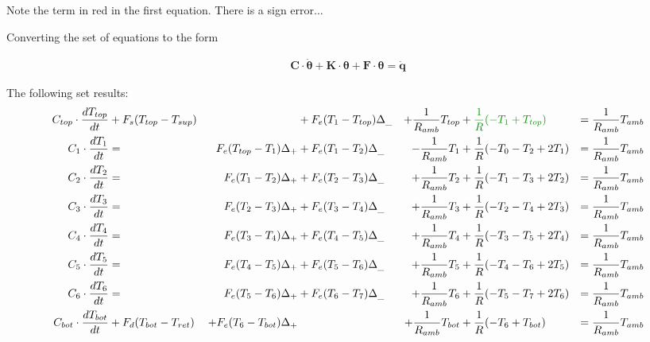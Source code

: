 \begin{scriptsize}
	Note the term in red in the first equation. There is a sign error...
	
	Converting the set of equations to the form
	
	\begin{subequations}
		\label{eq:matnot}
		\begin{align}
			\mathbf{C} \cdot \boldsymbol{\dot{\theta}} + \mathbf{K} \cdot \boldsymbol{\theta} + \mathbf{F} \cdot \boldsymbol{\theta}= \mathbf{\dot{q}}
		\end{align}
	\end{subequations}
	
	The following set results:
	\begin{equation}
		\begin{aligned}
			C_{top} \cdot \frac{dT_{top}}{dt} &+F_s (T_{top} - T_{sup}) &&+ F_e (T_1 - T_{top}) \Delta_{\_} &+ \frac{1}{R_{amb}} T_{top} &+ {\color{darkgreen}\frac{1}{R} (-T_1 + T_{top})}  &= \frac{1}{R_{amb}} T_{amb} \\
			C_1 \cdot \frac{dT_1}{dt} &= &F_e (T_{top} - T_1) \Delta_{+} &+ F_e (T_1 - T_2) \Delta_{\_} &- \frac{1}{R_{amb}} T_1 &+ \frac{1}{R} (-T_0 -T_2 + 2 T_1) &= \frac{1}{R_{amb}} T_{amb}\\
			C_2 \cdot \frac{dT_2}{dt} &= &F_e (T_1 - T_2) \Delta_{+} &+ F_e (T_2 - T_3) \Delta_{\_} &+ \frac{1}{R_{amb}} T_2 &+ \frac{1}{R} (-T_1 -T_3 + 2 T_2) &= \frac{1}{R_{amb}} T_{amb}\\
			C_3 \cdot \frac{dT_3}{dt} &= &F_e (T_2 - T_3) \Delta_{+} &+ F_e (T_3 - T_4) \Delta_{\_} &+ \frac{1}{R_{amb}} T_3 &+ \frac{1}{R} (-T_2 - T_4 + 2 T_3) &= \frac{1}{R_{amb}} T_{amb}\\
			C_4 \cdot \frac{dT_4}{dt} &= &F_e (T_3 - T_4) \Delta_{+} &+ F_e (T_4 - T_5) \Delta_{\_} &+ \frac{1}{R_{amb}} T_4 &+ \frac{1}{R} (-T_3 - T_5 + 2 T_4) &= \frac{1}{R_{amb}} T_{amb}\\
			C_5 \cdot \frac{dT_5}{dt} &= &F_e (T_4 - T_5) \Delta_{+} &+ F_e (T_5 - T_6) \Delta_{\_} &+ \frac{1}{R_{amb}} T_5 &+ \frac{1}{R} (-T_4 - T_6 + 2 T_5) &= \frac{1}{R_{amb}} T_{amb}\\
			C_6 \cdot \frac{dT_6}{dt} &= &F_e (T_5 - T_6) \Delta_{+} &+ F_e (T_6 - T_7) \Delta_{\_} &+ \frac{1}{R_{amb}} T_6 &+ \frac{1}{R} (-T_5 - T_7 + 2 T_6) &= \frac{1}{R_{amb}} T_{amb}\\
			C_{bot} \cdot \frac{dT_{bot}}{dt} &+ F_d (T_{bot} - T_{ret}) &+ F_e (T_6 - T_{bot}) \Delta_{+} &&+ \frac{1}{R_{amb}} T_{bot} &+ \frac{1}{R} (-T_6 + T_{bot}) &= \frac{1}{R_{amb}} T_{amb}\\
		\end{aligned}
	\end{equation}
	

\end{scriptsize}
